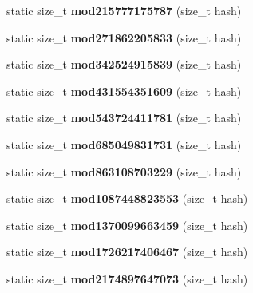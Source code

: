 \begin{DoxyCompactItemize}
\item 
static size\+\_\+t {\bfseries mod215777175787} (size\+\_\+t hash)\label{structska_1_1prime__number__hash__policy_a508a41e218eb9544ff841bb185d5a8d0}

\item 
static size\+\_\+t {\bfseries mod271862205833} (size\+\_\+t hash)\label{structska_1_1prime__number__hash__policy_a95f1575f404f2f0b5dd37a9a12dce8c2}

\item 
static size\+\_\+t {\bfseries mod342524915839} (size\+\_\+t hash)\label{structska_1_1prime__number__hash__policy_acac67709378e5402de5037bdc7754b62}

\item 
static size\+\_\+t {\bfseries mod431554351609} (size\+\_\+t hash)\label{structska_1_1prime__number__hash__policy_a3cf2c4f2c2becf50b470b693f4a1e237}

\item 
static size\+\_\+t {\bfseries mod543724411781} (size\+\_\+t hash)\label{structska_1_1prime__number__hash__policy_ae641d1d595c6cd788e8f69b0413ba3a7}

\item 
static size\+\_\+t {\bfseries mod685049831731} (size\+\_\+t hash)\label{structska_1_1prime__number__hash__policy_ad184c8bae353ab65f9bc01e977be0ae2}

\item 
static size\+\_\+t {\bfseries mod863108703229} (size\+\_\+t hash)\label{structska_1_1prime__number__hash__policy_ab02bddc25d3f5afd91d30ee205370c06}

\item 
static size\+\_\+t {\bfseries mod1087448823553} (size\+\_\+t hash)\label{structska_1_1prime__number__hash__policy_acb45f2c723fcf140ffad28e8897b754f}

\item 
static size\+\_\+t {\bfseries mod1370099663459} (size\+\_\+t hash)\label{structska_1_1prime__number__hash__policy_afb903af889e634f2270454fe342021b2}

\item 
static size\+\_\+t {\bfseries mod1726217406467} (size\+\_\+t hash)\label{structska_1_1prime__number__hash__policy_a49b21b5dd337d587f9ae785603d3e21c}

\item 
static size\+\_\+t {\bfseries mod2174897647073} (size\+\_\+t hash)\label{structska_1_1prime__number__hash__policy_a0aaefe43940c78b17fab14d24393c236}


\end{DoxyCompactItemize}
